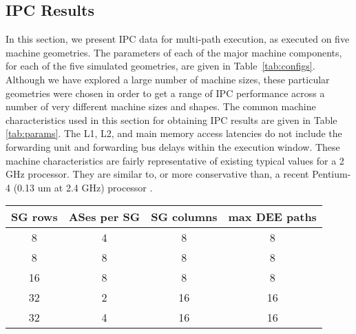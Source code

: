 \documentclass[10pt,twocolumn,dvips]{article}
\begin{document}
\subsection{IPC Results}
%
In this section, we present IPC data for  
multi-path execution, as executed on five machine geometries.
The parameters of each of the major machine components, for each of the 
five
simulated geometries, are given in Table~\ref{tab:configs}.
Although we have explored a large number of machine sizes, 
these particular geometries were chosen in order
to get a range of IPC performance across a number of very
different machine sizes and shapes.
The common machine characteristics used in this section for
obtaining IPC results are given in Table \ref{tab:params}.
The L1, L2, and main memory access latencies do not include
the forwarding unit and forwarding bus delays within the
execution window.
These machine characteristics are fairly representative of
existing typical values for a 2 GHz processor.  
They are similar to, or more conservative
than, a recent Pentium-4 (0.13 um at 2.4 GHz) processor \cite{Lud02}.
%
\begin{table*}
\scriptsize{
\begin{center}
\caption{Machine geometries simulated for each of the benchmark
programs.}
\label{tab:configs}
\begin{tabular}{|c|c|c|c|}
\hline 
SG rows&
ASes per SG&
SG columns&
max DEE paths\\
\hline
\hline 
8&4&8&8\\
\hline 
8&8&8&8\\
\hline 
16&8&8&8\\
\hline 
32&2&16&16\\
\hline 
32&4&16&16\\
\hline
\end{tabular}
\end{center}
}
\end{table*}
%
\end{document}
